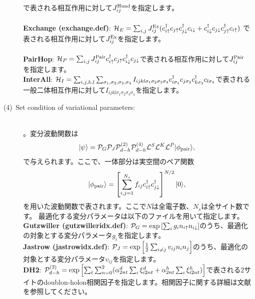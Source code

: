 \begin{description}
で表される相互作用に対して$J_{ij}^{\rm Hund}$を指定します。\\
~\\{\bf Exchange (exchange.def)}:
${\cal H}_E=\sum_{i,j}J_{ij}^{\rm Ex} (c_ {i \uparrow}^{\dag}c_{j\uparrow}c_{j \downarrow}^{\dag}c_{i  \downarrow}+c_ {i \downarrow}^{\dag}c_{j\downarrow}c_{j \uparrow}^{\dag}c_{i  \uparrow})$
で表される相互作用に対して$J_{ij}^{\rm Ex}$を指定します。\\
~\\{\bf PairHop}:  ${\cal H}_P =\sum_{i,j}J_{ij}^{\rm Pair} c_ {i \uparrow}^{\dag}c_{j\uparrow}c_{i \downarrow}^{\dag}c_{j  \downarrow}
$で表される相互作用に対して$J_{ij}^{\rm Pair}$を指定します。
~\\{\bf InterAll}: ${\cal H}_I=\sum_{i,j,k,l}\sum_{\sigma_1,\sigma_2, \sigma_3, \sigma_4}
I_{ijkl\sigma_1\sigma_2\sigma_3\sigma_4}c_{i\sigma_1}^{\dagger}c_{j\sigma_2}c_{k\sigma_3}^{\dagger}c_{l\sigma_4}$で表される一般二体相互作用に対して$I_{ijkl\sigma_1\sigma_2\sigma_3\sigma_4}$を指定します。\\
\item[(4)~Set condition of variational parameters:] 
~\\ 。変分波動関数は
\begin{equation}
|\psi \rangle = {\cal P}_G{\cal P}_J{\cal P}_{d-h}^{(2)}{\cal P}_{d-h}^{(4)}{\cal L}^S{\cal L}^K{\cal L}^P |\phi_{\rm pair} \rangle,
\end{equation}
で与えられます。ここで、一体部分は実空間のペア関数
\begin{equation}
|\phi_{\rm pair} \rangle = \left[\sum_{i, j=1}^{N_s} f_{ij}c_{i\uparrow}^{\dag}c_{j\downarrow}^{\dag} \right]^{N/2}|0 \rangle,
\end{equation}
を用いた波動関数で表されます。ここで$N$は全電子数、$N_s$は全サイト数です。
最適化する変分パラメータは以下のファイルを用いて指定します。
~\\{\bf Gutzwiller (gutzwilleridx.def)}: ${\cal P}_G=\exp\left[ \sum_i g_i n_{i\uparrow} n_{i\downarrow} \right]$のうち、最適化の対象とする変分パラメータ$g_i$を指定します。
~\\{\bf Jastrow (jastrowidx.def)}: ${\cal P}_J=\exp\left[\frac{1}{2} \sum_{i\neq j} v_{ij} n_i n_j\right]$のうち、最適化の対象とする変分パラメータ$v_{ij}$を指定します。
~\\{\bf DH2}:  ${\cal P}_{d-h}^{(2)}= \exp \left[ \sum_t \sum_{n=0}^2 (\alpha_{2nt}^d \sum_{i}\xi_{i2nt}^d+\alpha_{2nt}^h \sum_{i}\xi_{i2nt}^h)\right]$で表される2サイトのdoublon-holon相関因子を指定します。相関因子に関する詳細は文献\cite{Tahara2008}を参照してください。

\end{description}

